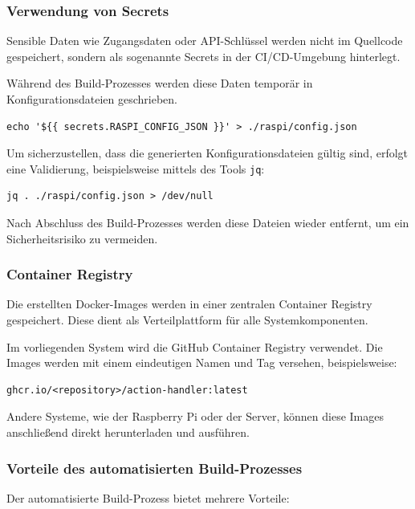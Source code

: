 \subsubsection{Verwendung von Secrets}

Sensible Daten wie Zugangsdaten oder API-Schlüssel werden nicht im Quellcode gespeichert, sondern als sogenannte Secrets in der CI/CD-Umgebung hinterlegt.

Während des Build-Prozesses werden diese Daten temporär in Konfigurationsdateien geschrieben. 

\begin{verbatim}
echo '${{ secrets.RASPI_CONFIG_JSON }}' > ./raspi/config.json
\end{verbatim}
\label{lst:secret_example}

Um sicherzustellen, dass die generierten Konfigurationsdateien gültig sind, erfolgt eine Validierung, beispielsweise mittels des Tools \texttt{jq}:

\begin{verbatim}
jq . ./raspi/config.json > /dev/null
\end{verbatim}

Nach Abschluss des Build-Prozesses werden diese Dateien wieder entfernt, um ein Sicherheitsrisiko zu vermeiden.

\subsubsection{Container Registry}

Die erstellten Docker-Images werden in einer zentralen Container Registry gespeichert. Diese dient als Verteilplattform für alle Systemkomponenten.

Im vorliegenden System wird die GitHub Container Registry verwendet. Die Images werden mit einem eindeutigen Namen und Tag versehen, beispielsweise:

\begin{verbatim}
ghcr.io/<repository>/action-handler:latest
\end{verbatim}

Andere Systeme, wie der Raspberry Pi oder der Server, können diese Images anschließend direkt herunterladen und ausführen.

\subsubsection{Vorteile des automatisierten Build-Prozesses}

Der automatisierte Build-Prozess bietet mehrere Vorteile:

